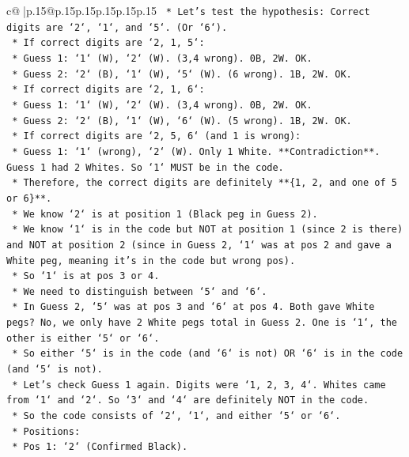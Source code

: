 \documentclass{article}
\begin{document}
{\begin{supertabular}{c@{$\;$}|p{.15\linewidth}@{}p{.15\linewidth}p{.15\linewidth}p{.15\linewidth}p{.15\linewidth}p{.15\linewidth}}
{{{\texttt{        *   Let's test the hypothesis: Correct digits are `2`, `1`, and `5`. (Or `6`).} \\
\texttt{        *   If correct digits are `2, 1, 5`:} \\
\texttt{            *   Guess 1: `1` (W), `2` (W). (3,4 wrong). 0B, 2W. OK.} \\
\texttt{            *   Guess 2: `2` (B), `1` (W), `5` (W). (6 wrong). 1B, 2W. OK.} \\
\texttt{        *   If correct digits are `2, 1, 6`:} \\
\texttt{            *   Guess 1: `1` (W), `2` (W). (3,4 wrong). 0B, 2W. OK.} \\
\texttt{            *   Guess 2: `2` (B), `1` (W), `6` (W). (5 wrong). 1B, 2W. OK.} \\
\texttt{        *   If correct digits are `2, 5, 6` (and 1 is wrong):} \\
\texttt{            *   Guess 1: `1` (wrong), `2` (W). Only 1 White. **Contradiction**. Guess 1 had 2 Whites. So `1` MUST be in the code.} \\
\texttt{    *   Therefore, the correct digits are definitely **\{1, 2, and one of 5 or 6\}**.} \\
\texttt{    *   We know `2` is at position 1 (Black peg in Guess 2).} \\
\texttt{    *   We know `1` is in the code but NOT at position 1 (since 2 is there) and NOT at position 2 (since in Guess 2, `1` was at pos 2 and gave a White peg, meaning it's in the code but wrong pos).} \\
\texttt{    *   So `1` is at pos 3 or 4.} \\
\texttt{    *   We need to distinguish between `5` and `6`.} \\
\texttt{    *   In Guess 2, `5` was at pos 3 and `6` at pos 4. Both gave White pegs? No, we only have 2 White pegs total in Guess 2. One is `1`, the other is either `5` or `6`.} \\
\texttt{    *   So either `5` is in the code (and `6` is not) OR `6` is in the code (and `5` is not).} \\
\texttt{    *   Let's check Guess 1 again. Digits were `1, 2, 3, 4`. Whites came from `1` and `2`. So `3` and `4` are definitely NOT in the code.} \\
\texttt{    *   So the code consists of `2`, `1`, and either `5` or `6`.} \\
\texttt{    *   Positions:} \\
\texttt{        *   Pos 1: `2` (Confirmed Black).} \\
}}}
\end{supertabular}}
\end{document}
